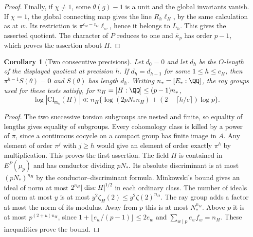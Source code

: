 \documentclass[a4paper,11pt]{article}
\newtheorem{corollary}[proposition]{Corollary}
\theoremstyle{definition}
\theoremstyle{remark}
\numberwithin{equation}{section}
\begin{document}
\begin{proof}
Finally, if \(\chi\ne1\), some \(\theta(g)-1\) is a unit
and the global invariants vanish. If \(\chi=1\), the global
connecting map gives the line \(R_h\ell_H\), by the same
calculation as at \(w\). Its restriction is
\(\pi^{c_w-c_H}\ell_w\), hence it belongs to \(L_h\).
This gives the asserted quotient. The character of \(P\)
reduces to one and \(\bar\kappa_p\) has order \(p-1\),
which proves the assertion about \(H\).
\end{proof}

\begin{corollary}[Two consecutive precisions]
\leavevmode\label{cor:raystable656}
Let \(d_0=0\) and let \(d_h\) be the \(O\)-length of the
displayed quotient at precision \(h\). If \(d_h=d_{h-1}\) for
some \(1\le h\le c_H\), then \(\pi^{h-1}S(\theta)=0\)
and \(S(\theta)\) has length \(d_h\).
Writing \(n_*=[E_*:\QQ]\), the ray groups used for these tests
satisfy, for \(n_H=[H:\QQ]\le (p-1)n_*\),
\[
 \log|\mathrm{Cl}_{\mathfrak m_h}(H)|
 \ll n_H\{\log(2pN_*n_H)+(2+\lceil h/e\rceil)\log p\}.
\]
\end{corollary}
\begin{proof}
The two successive torsion subgroups are nested and finite,
so equality of lengths gives equality of subgroups. Every
cohomology class is killed by a power of \(\pi\), since a
continuous cocycle on a compact group has finite image in \(A\).
Any element of order \(\pi^j\) with \(j\ge h\) would give an
element of order exactly \(\pi^h\) by multiplication. This proves
the first assertion. The field \(H\) is contained in
\(E^P(\mu_p)\) and has conductor dividing \(pN_*\). Its absolute
discriminant is at most \((pN_*)^{n_H}\) by the
conductor--discriminant formula. Minkowski's bound gives an ideal
of norm at most \(2^{n_H}|\operatorname{disc}H|^{1/2}\) in
each ordinary class. The number of ideals of norm at most \(y\)
is at most \(y^2\zeta_H(2)\le y^2\zeta(2)^{n_H}\).
The ray group adds a factor at most the norm of its modulus.
Away from \(p\) this is at most \(N_*^{n_H}\). Above \(p\)
it is at most \(p^{(2+u)n_H}\), since
\(1+\lfloor e_w/(p-1)\rfloor\le2e_w\) and
\(\sum_{w\mid p}e_w f_w=n_H\). These inequalities prove the bound.
\end{proof}
\end{document}
